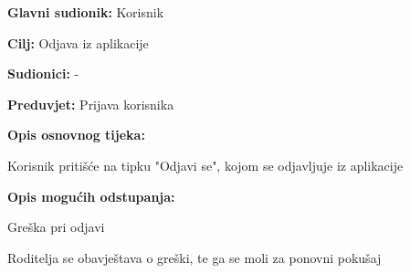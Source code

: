 					\noindent {}
					\begin{packed_item}
						
						\item \textbf{Glavni sudionik: }Korisnik
						\item  \textbf{Cilj:} Odjava iz aplikacije
						\item  \textbf{Sudionici:} -
						\item  \textbf{Preduvjet:} Prijava korisnika
						\item  \textbf{Opis osnovnog tijeka:}
						
						\item[] \begin{packed_enum}
							
							\item Korisnik pritišće na tipku "Odjavi se", kojom se odjavljuje iz aplikacije
						\end{packed_enum}
						\item  \textbf{Opis mogućih odstupanja:}
						\item[] \begin{packed_item}
							
							\item[1.a] Greška pri odjavi
							\item[] \begin{packed_enum}
								
								\item Roditelja se obavještava o greški, te ga se moli za ponovni pokušaj
								
							\end{packed_enum}
						\end{packed_item}
					\end{packed_item}
					
